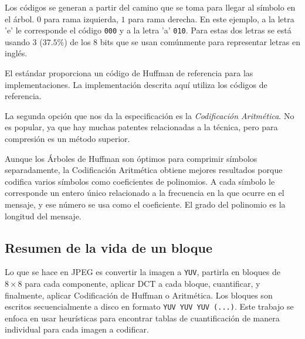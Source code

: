 Los códigos se generan a partir del camino que se toma para llegar al símbolo
en el árbol. $0$ para rama izquierda, $1$ para rama derecha. En este ejemplo, a
la letra 'e' le corresponde el código \verb+000+ y a la letra 'a' \verb+010+.
Para estas dos letras se está usando 3 ($37.5\%$) de los 8 bits que se
usan comúnmente para representar letras en inglés.

El estándar proporciona un código de Huffman de referencia para las
implementaciones. La implementación descrita aquí utiliza los códigos de
referencia.

La segunda opción que nos da la especificación es la \emph{\gls{Codificación
Aritmética}}. No es popular, ya que hay muchas patentes relacionadas a la
técnica, pero para compresión es un método superior.

Aunque los Árboles de Huffman son óptimos para comprimir símbolos
separadamente, la Codificación Aritmética obtiene mejores resultados porque
codifica varios símbolos como coeficientes de polinomios. A cada símbolo le
corresponde un entero único relacionado a la frecuencia en la que ocurre en el
mensaje, y ese número se usa como el coeficiente. El grado del polinomio es la
longitud del mensaje.

\subsection{Resumen de la vida de un bloque}

Lo que se hace en JPEG es convertir la imagen a \verb+YUV+, partirla en bloques
de $8\times8$ para cada componente, aplicar DCT a cada bloque, cuantificar, y
finalmente, aplicar Codificación de Huffman o Aritmética. Los bloques son
escritos secuencialmente a disco en formato \verb+YUV YUV YUV (...)+. Este
trabajo se enfoca en usar heurísticas para encontrar tablas de cuantificación
de manera individual para cada imagen a codificar.

%
